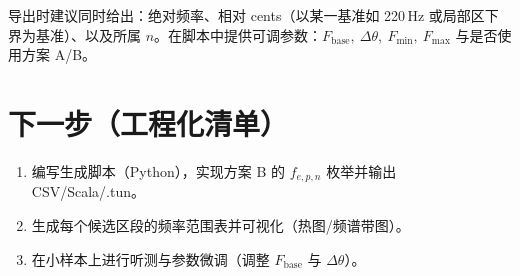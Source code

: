 \documentclass{article}
\begin{document}
导出时建议同时给出：绝对频率、相对 cents（以某一基准如 220\,Hz 或局部区下界为基准）、以及所属 \(n\)。在脚本中提供可调参数：\(F_{\mathrm{base}},\ \Delta\theta,\ F_{\min},\ F_{\max}\) 与是否使用方案 A/B。

\section*{下一步（工程化清单）}
\begin{enumerate}
  \item 编写生成脚本（Python），实现方案 B 的 \(f_{e,p,n}\) 枚举并输出 CSV/Scala/.tun。
  \item 生成每个候选区段的频率范围表并可视化（热图/频谱带图）。
  \item 在小样本上进行听测与参数微调（调整 \(F_{\mathrm{base}}\) 与 \(\Delta\theta\)）。
\end{enumerate}
\end{document}
